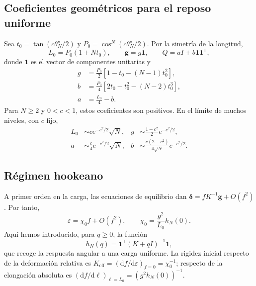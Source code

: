 \documentclass[11pt,a4paper]{article}
\begin{document}
\subsection{Coeficientes geométricos para el reposo uniforme}

Sea $t_0=\tan(c\theta_N^\star/2)$ y
$P_0=\cos^N(c\theta_N^\star/2)$. Por la simetría de la longitud,
\begin{equation}
L_0=P_0(1+Nt_0),\qquad
\mathbf g=g\mathbf1,\qquad Q=aI+b\mathbf1\mathbf1^{\mathsf T},
\label{eq:uniform_geometry_coefficients}
\end{equation}
donde $\mathbf1$ es el vector de componentes unitarias y
\begin{align}
g&=\frac{P_0}{2}\left[1-t_0-(N-1)t_0^2\right],\\
b&=\frac{P_0}{4}\left[2t_0-t_0^2-(N-2)t_0^3\right],\\
a&=\frac{L_0}{4}-b.
\label{eq:gab_def}
\end{align}
Para $N\geq2$ y $0<c<1$, estos coeficientes son positivos.
En el límite de muchos niveles, con $c$ fijo,
\begin{equation}
\begin{aligned}
L_0&\sim c e^{-c^2/2}\sqrt N,
& g&\sim\frac{1-c^2}{2}e^{-c^2/2},\\
a&\sim\frac{c}{4}e^{-c^2/2}\sqrt N,
& b&\sim\frac{c(2-c^2)}{4\sqrt N}e^{-c^2/2}.
\end{aligned}
\label{eq:geometry_coefficients_scaling}
\end{equation}

\subsection{Régimen hookeano}

A primer orden en la carga, las ecuaciones de equilibrio dan
$\boldsymbol\delta=fK^{-1}\mathbf g+O(f^2)$. Por tanto,
\begin{equation}
\boxed{
\varepsilon=\chi_0 f+O(f^2),\qquad
\chi_0=\frac{g^2}{L_0}h_N(0).
}
\label{eq:hookean_compliance}
\end{equation}
Aquí hemos introducido, para $q\geq0$, la función
\begin{equation}
h_N(q)=\mathbf1^{\mathsf T}(K+qI)^{-1}\mathbf1,
\label{eq:resolvent_definition}
\end{equation}
que recoge la respuesta angular a una carga uniforme.
La rigidez inicial respecto de la deformación relativa es
$K_{\mathrm{eff}}=(\mathrm df/\mathrm d\varepsilon)_{f=0}=\chi_0^{-1}$;
respecto de la elongación absoluta es
$(\mathrm df/\mathrm d\ell)_{\ell=L_0}=(g^2h_N(0))^{-1}$.
\end{document}

